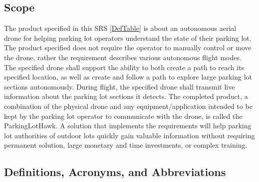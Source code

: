\documentclass{article}
\begin{document}
\subsection{Scope}
The product specified in this SRS \ref{DefTable} is about an autonomous aerial drone for helping parking lot operators understand the state of their parking lot. The product specified does not require the operator to manually control or move the drone, rather the requirement describes various autonomous flight modes. The specified drone shall support the ability to both create a path to reach its specified location, as well as create and follow a path to explore large parking lot sections autonomously. During flight, the specified drone shall transmit live information about the parking lot sections it detects. The completed product, a combination of the physical drone and any equipment/application intended to be kept by the parking lot operator to communicate with the drone, is called the ParkingLotHawk. A solution that implements the requirements will help parking lot authorities of outdoor lots quickly gain valuable information without requiring permanent solution, large monetary and time investments, or complex training. 



\subsection{Definitions, Acronyms, and Abbreviations}
\end{document}

